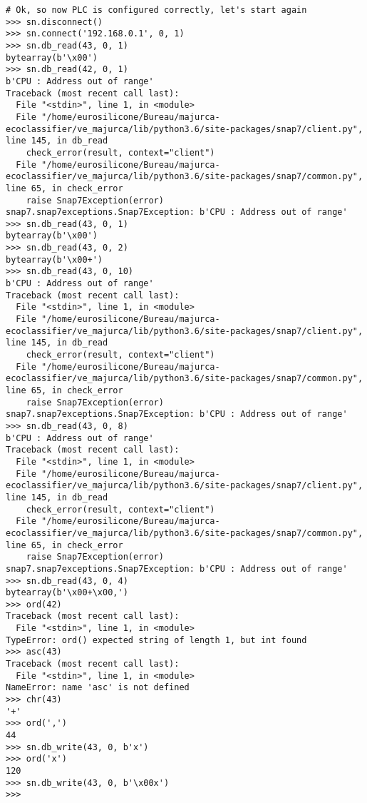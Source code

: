\begin{lstlisting}[style=Python-color,caption={Sample Snap7 session}]
# Ok, so now PLC is configured correctly, let's start again
>>> sn.disconnect()
>>> sn.connect('192.168.0.1', 0, 1)
>>> sn.db_read(43, 0, 1)
bytearray(b'\x00')
>>> sn.db_read(42, 0, 1)
b'CPU : Address out of range'
Traceback (most recent call last):
  File "<stdin>", line 1, in <module>
  File "/home/eurosilicone/Bureau/majurca-ecoclassifier/ve_majurca/lib/python3.6/site-packages/snap7/client.py", line 145, in db_read
    check_error(result, context="client")
  File "/home/eurosilicone/Bureau/majurca-ecoclassifier/ve_majurca/lib/python3.6/site-packages/snap7/common.py", line 65, in check_error
    raise Snap7Exception(error)
snap7.snap7exceptions.Snap7Exception: b'CPU : Address out of range'
>>> sn.db_read(43, 0, 1)
bytearray(b'\x00')
>>> sn.db_read(43, 0, 2)
bytearray(b'\x00+')
>>> sn.db_read(43, 0, 10)
b'CPU : Address out of range'
Traceback (most recent call last):
  File "<stdin>", line 1, in <module>
  File "/home/eurosilicone/Bureau/majurca-ecoclassifier/ve_majurca/lib/python3.6/site-packages/snap7/client.py", line 145, in db_read
    check_error(result, context="client")
  File "/home/eurosilicone/Bureau/majurca-ecoclassifier/ve_majurca/lib/python3.6/site-packages/snap7/common.py", line 65, in check_error
    raise Snap7Exception(error)
snap7.snap7exceptions.Snap7Exception: b'CPU : Address out of range'
>>> sn.db_read(43, 0, 8)
b'CPU : Address out of range'
Traceback (most recent call last):
  File "<stdin>", line 1, in <module>
  File "/home/eurosilicone/Bureau/majurca-ecoclassifier/ve_majurca/lib/python3.6/site-packages/snap7/client.py", line 145, in db_read
    check_error(result, context="client")
  File "/home/eurosilicone/Bureau/majurca-ecoclassifier/ve_majurca/lib/python3.6/site-packages/snap7/common.py", line 65, in check_error
    raise Snap7Exception(error)
snap7.snap7exceptions.Snap7Exception: b'CPU : Address out of range'
>>> sn.db_read(43, 0, 4)
bytearray(b'\x00+\x00,')
>>> ord(42)
Traceback (most recent call last):
  File "<stdin>", line 1, in <module>
TypeError: ord() expected string of length 1, but int found
>>> asc(43)
Traceback (most recent call last):
  File "<stdin>", line 1, in <module>
NameError: name 'asc' is not defined
>>> chr(43)
'+'
>>> ord(',')
44
>>> sn.db_write(43, 0, b'x')
>>> ord('x')
120
>>> sn.db_write(43, 0, b'\x00x')
>>>
\end{lstlisting}
